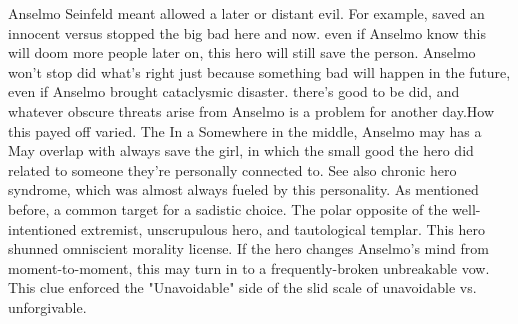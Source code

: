 \documentclass[12pt]{book}
\begin{document}
Anselmo Seinfeld meant allowed a later or distant evil. For example, saved an innocent versus stopped the big bad here and now. even if Anselmo know this will doom more people later on, this hero will still save the person. Anselmo won't stop did what's right just because something bad will happen in the future, even if Anselmo brought cataclysmic disaster. there's good to be did, and whatever obscure threats arise from Anselmo is a problem for another day.How this payed off varied. The In a Somewhere in the middle, Anselmo may has a May overlap with always save the girl, in which the small good the hero did related to someone they're personally connected to. See also chronic hero syndrome, which was almost always fueled by this personality. As mentioned before, a common target for a sadistic choice. The polar opposite of the well-intentioned extremist, unscrupulous hero, and tautological templar. This hero shunned omniscient morality license. If the hero changes Anselmo's mind from moment-to-moment, this may turn in to a frequently-broken unbreakable vow. This clue enforced the "Unavoidable" side of the slid scale of unavoidable vs. unforgivable.
\end{document}
